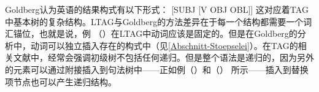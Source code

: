 Goldberg\citet[]{Goldberg95a}认为英语的结果构式有以下形式：
\ea
{}[SUBJ [V OBJ OBL]] 
\z
这对应着TAG中基本树的复杂结构。LTAG与Goldberg的方法差异在于每一个结构都需要一个词汇锚位，也就是说，例 （）在LTAG中动词应该是固定的。但是在Goldberg的分析中，动词可以独立插入存在的构式中（见\ref{Abschnitt-Stoepselei}）。在TAG的相关文献中，经常会强调初级树不包括任何递归。但是整个语法是递归的，因为另外的元素可以通过附接插入到句法树中——正如例（）和（） 所示——插入到替换项节点也可以产生递归结构。



